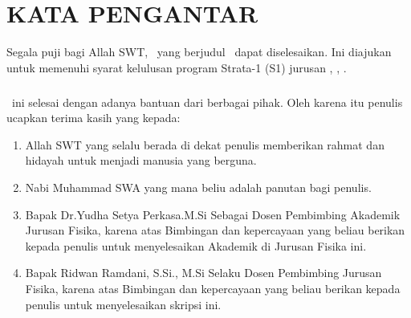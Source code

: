 \chapter*{KATA PENGANTAR} 

Segala puji bagi Allah SWT, \model \ yang berjudul \judul\ dapat diselesaikan. Ini diajukan untuk memenuhi syarat kelulusan program Strata-1 (S1) jurusan \jur, \fak, \kampus. 
\paragraph{}
\model \ ini selesai dengan adanya bantuan dari berbagai pihak. Oleh karena itu penulis ucapkan terima kasih yang kepada:
\begin{enumerate}
\item Allah SWT yang selalu berada di dekat penulis memberikan rahmat dan hidayah untuk menjadi manusia yang berguna.
\item Nabi Muhammad SWA yang mana beliu adalah panutan bagi penulis.
\item Bapak Dr.Yudha Setya Perkasa.M.Si Sebagai Dosen Pembimbing Akademik Jurusan Fisika, karena atas Bimbingan dan kepercayaan yang beliau berikan kepada penulis untuk menyelesaikan Akademik di Jurusan Fisika  ini.
\item Bapak Ridwan Ramdani, S.Si., M.Si Selaku Dosen Pembimbing Jurusan Fisika, karena atas Bimbingan dan kepercayaan yang beliau berikan kepada penulis untuk menyelesaikan skripsi ini.

\end{enumerate}
